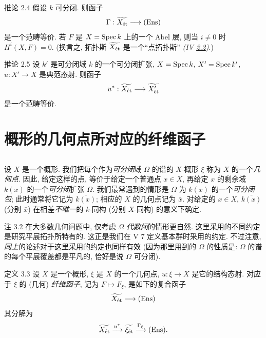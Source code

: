 \begin{enonce*}{推论 2.4}
假设 $k$ 可分闭. 则函子
$$
\Gamma : \widetilde{X_{\text{\rm ét}}} \to (\Ens)
$$
是一个范畴等价. 若 $F$ 是 $X=\operatorname{Spec} k$ 上的一个 Abel 层,
则当 $i\neq0$ 时 $H^{i}(X,F)=0$.
(换言之, 拓扑斯 $\widetilde{X_{\text{\rm ét}}}$ 是一个“点拓扑斯”
\emph{(IV \hyperref[IV.subsec2.2]{2.2})}.)
\end{enonce*}

\begin{enonce*}{推论 2.5}
设 $k'$ 是可分闭域 $k$ 的一个可分闭扩张,
$X=\operatorname{Spec} k$, $X'=\operatorname{Spec} k'$, $u:X'\to X$ 是典范态射.
则函子
$$
u^{\ast} : \widetilde{X_{\text{\rm ét}}} \to \widetilde{X'_{\text{\rm ét}}}
$$
是一个范畴等价.
\end{enonce*}

\section{概形的几何点所对应的纤维函子}\pageoriginale

\subsection{}

设 $X$ 是一个概形. 我们把每个作为\emph{可分闭}域 $\Omega$ 的谱的
$X$-概形 $\xi$ 称为 $X$ 的一个\emph{几何点}.
因此, 给定这样的点, 等价于给定一个普通点 $x\in X$,
再给定 $x$ 的剩余域 $k(x)$ 的一个\emph{可分闭}扩张 $\Omega$.
我们最常遇到的情形是 $\Omega$ 为 $k(x)$ 的一个\emph{可分闭包};
此时通常将它记为 $\bar{k(x)}$; 相应的 $X$ 的几何点记为 $\bar{x}$.
对给定的 $x\in X$, $\bar{k(x)}$ (分别 $\bar{x}$)
在相差\emph{不唯一}的 $k$-同构 (分别 $X$-同构) 的意义下确定.

\begin{enonce*}[remark]{注 3.2}
在大多数几何问题中, 仅考虑 $\Omega$ \emph{代数闭}的情形更自然.
这里采用的不同约定是研究平展拓扑所特有的.
这正是我们在  V 7 定义基本群时采用的约定.
不过注意, \emph{同上}的论述对于这里采用的约定也同样有效
(因为那里用到的 $\Omega$ 的性质是:
$\Omega$ 的谱的每个平展覆盖都是平凡的,
\ie 恰好是说 $\Omega$ 可分闭).
\end{enonce*}

\begin{enonce*}{定义 3.3}
设 $X$ 是一个概形, $\xi$ 是 $X$ 的一个几何点,
$u:\xi\to X$ 是它的结构态射.
对应于 $\xi$ 的 (几何) \emph{纤维函子}, 记为 $F\mapsto F_{\xi}$,
是如下的复合函子
$$
\widetilde{X_{\text{\rm ét}}} \to (\Ens)
$$
其分解为
$$
\widetilde{X_{\text{\rm ét}}} \xrightarrow{u^{\ast}}
\widetilde{\xi_{\text{\rm ét}}} \xrightarrow{\Gamma_{\xi}} (\operatorname{Ens}){}.
$$
\end{enonce*}

